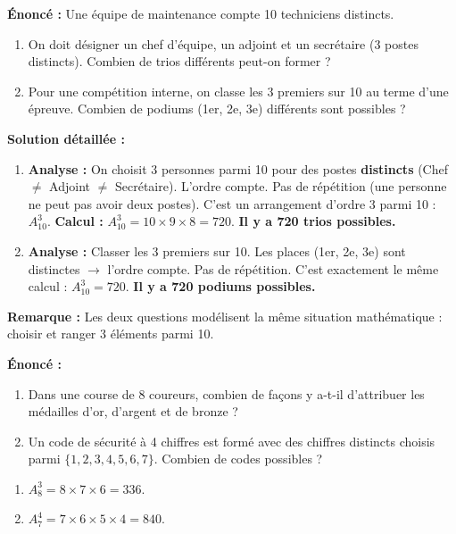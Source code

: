 \documentclass[11pt]{article}
\begin{document}
\begin{exoresolu}
\textbf{Énoncé :} Une équipe de maintenance compte 10 techniciens distincts.
\begin{enumerate}
    \item On doit désigner un chef d'équipe, un adjoint et un secrétaire (3 postes distincts). Combien de trios différents peut-on former ?
    \item Pour une compétition interne, on classe les 3 premiers sur 10 au terme d'une épreuve. Combien de podiums (1er, 2e, 3e) différents sont possibles ?
\end{enumerate}
\tcblower
\textbf{Solution détaillée :}
\begin{enumerate}
    \item \textbf{Analyse :} On choisit 3 personnes parmi 10 pour des postes \textbf{distincts} (Chef $\neq$ Adjoint $\neq$ Secrétaire). L'ordre compte. Pas de répétition (une personne ne peut pas avoir deux postes). C'est un arrangement d'ordre 3 parmi 10 : $A_{10}^3$.
    \textbf{Calcul :} $A_{10}^3 = 10 \times 9 \times 8 = 720$.
    \textbf{Il y a 720 trios possibles.}
    \item \textbf{Analyse :} Classer les 3 premiers sur 10. Les places (1er, 2e, 3e) sont distinctes $\rightarrow$ l'ordre compte. Pas de répétition. C'est exactement le même calcul : $A_{10}^3 = 720$.
    \textbf{Il y a 720 podiums possibles.}
\end{enumerate}
\textbf{Remarque :} Les deux questions modélisent la même situation mathématique : choisir et ranger 3 éléments parmi 10.
\end{exoresolu}

\begin{exercice}
\textbf{Énoncé :}
\begin{enumerate}
    \item Dans une course de 8 coureurs, combien de façons y a-t-il d'attribuer les médailles d'or, d'argent et de bronze ?
    \item Un code de sécurité à 4 chiffres est formé avec des chiffres distincts choisis parmi $\{1,2,3,4,5,6,7\}$. Combien de codes possibles ?
\end{enumerate}
\end{exercice}

\begin{corrige}
\begin{enumerate}
    \item $A_8^3 = 8 \times 7 \times 6 = 336$.
    \item $A_7^4 = 7 \times 6 \times 5 \times 4 = 840$.
\end{enumerate}
\end{corrige}
\end{document}
